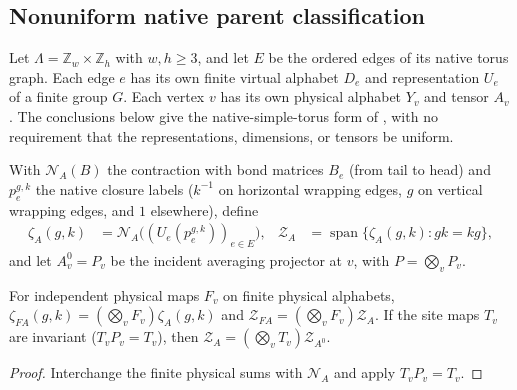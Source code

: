 \subsection{Nonuniform native parent classification}
\label{sec:peps_nonuniform_native_classification}

Let $\Lambda=\mathbb Z_w\times\mathbb Z_h$ with $w,h\geq3$, and let $E$
be the ordered edges of its native torus graph. Each edge $e$ has its own
finite virtual alphabet $D_e$ and representation $U_e$ of a finite group
$G$. Each vertex $v$ has its own physical alphabet $Y_v$ and tensor $A_v$.
The conclusions below give the native-simple-torus form of
\cite[Theorems~5.7 and~5.9]{Schuch2010PEPS}, with no requirement that the
representations, dimensions, or tensors be uniform.

\begin{definition}%
    \label{def:peps_nonuniform_native_closure}
    \leanok
    With $\mathcal N_A(B)$ the contraction with bond matrices $B_e$ (from tail
    to head) and $p^{g,k}_e$ the native closure labels ($k^{-1}$ on horizontal
    wrapping edges, $g$ on vertical wrapping edges, and $1$ elsewhere), define
    \begin{align}
        \zeta_A(g,k) & =\mathcal N_A\bigl((U_e(p^{g,k}_e))_{e\in E}\bigr),
                     & \mathcal Z_A                                        & =\operatorname{span}\{\zeta_A(g,k):gk=kg\},
        \label{eq:peps_nonuniform_native_closure}
    \end{align}
    and let $A^0_v=P_v$ be the incident averaging projector at $v$, with
    $P=\bigotimes_vP_v$.
\end{definition}

\begin{lemma}%
    \label{thm:peps_nonuniform_native_transport}
    \leanok
    For independent physical maps $F_v$ on finite physical alphabets,
    $\zeta_{FA}(g,k)=(\bigotimes_vF_v)\zeta_A(g,k)$ and
    $\mathcal Z_{FA}=(\bigotimes_vF_v)\mathcal Z_A$. If the site maps $T_v$ are
    invariant ($T_vP_v=T_v$), then $\mathcal Z_A=(\bigotimes_vT_v)\mathcal Z_{A^0}$.
\end{lemma}
\begin{proof}\leanok
    Interchange the finite physical sums with $\mathcal N_A$ and apply
    $T_vP_v=T_v$.
\end{proof}

